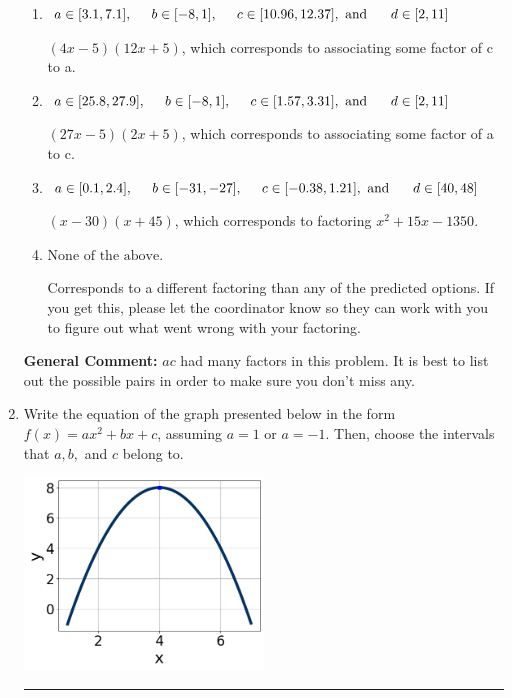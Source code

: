 \documentclass{extbook}[14pt]
\newcommand{\litem}[1]{\item #1

\rule{\textwidth}{0.4pt}}
\begin{document}
\begin{enumerate}
{\begin{enumerate}[label=\Alph*.]
* $(9x -5)(6x + 5)$, which is the correct option.
\item \( a \in [3.1, 7.1], \hspace*{5mm} b \in [-8, 1], \hspace*{5mm} c \in [10.96, 12.37], \text{ and } \hspace*{5mm} d \in [2, 11] \)

 $(4x -5)(12x + 5)$, which corresponds to associating some factor of c to a.
\item \( a \in [25.8, 27.9], \hspace*{5mm} b \in [-8, 1], \hspace*{5mm} c \in [1.57, 3.31], \text{ and } \hspace*{5mm} d \in [2, 11] \)

 $(27x -5)(2x + 5)$, which corresponds to associating some factor of a to c.
\item \( a \in [0.1, 2.4], \hspace*{5mm} b \in [-31, -27], \hspace*{5mm} c \in [-0.38, 1.21], \text{ and } \hspace*{5mm} d \in [40, 48] \)

 $(x -30)(x + 45)$, which corresponds to factoring $x^{2} +15 x -1350$.
\item \( \text{None of the above.} \)

 Corresponds to a different factoring than any of the predicted options. If you get this, please let the coordinator know so they can work with you to figure out what went wrong with your factoring.
\end{enumerate}

\textbf{General Comment:} $ac$ had many factors in this problem. It is best to list out the possible pairs in order to make sure you don't miss any.
}
\litem{
Write the equation of the graph presented below in the form $f(x)=ax^2+bx+c$, assuming  $a=1$ or $a=-1$. Then, choose the intervals that $a, b,$ and $c$ belong to.

\begin{center}
    \includegraphics[width=0.5\textwidth]{../Figures/quadraticGraphToEquationA.png}
\end{center}


}
\end{enumerate}
\end{document}
